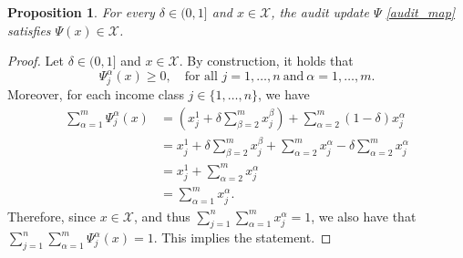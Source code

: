 \documentclass[10pt,a4paper]{amsart}
\newtheorem{proposition}{Proposition}
\begin{document}
\begin{proposition}\label{prop:audit}
For every $\delta \in (0,1]$ and $x \in \mathcal{X}$, the audit update $\Psi$ \eqref{audit_map} satisfies $\Psi(x)\in \mathcal{X}$. 
\end{proposition}

\begin{proof}
Let $\delta \in (0,1]$ and $x \in \mathcal{X}$. By construction, it holds that 
\begin{equation*}
    \Psi^\alpha_j(x) \geq 0, \quad \text{for all } j=1,\ldots,n \ \text{and} \ \alpha=1,\ldots,m.
\end{equation*}
Moreover, for each income class $j \in \{1,\ldots,n\}$, we have
\begin{align*}
 \sum_{\alpha=1}^m \Psi_j^\alpha(x)
&= \left(x_j^1 + \delta\sum_{\beta=2}^m x_j^\beta\right) + \sum_{\alpha=2}^m (1-\delta)x_j^\alpha \\
&= x_j^1 + \delta\sum_{\beta=2}^m x_j^\beta + \sum_{\alpha=2}^m x_j^\alpha - \delta\sum_{\alpha=2}^m x_j^\alpha \\
&= x_j^1 + \sum_{\alpha=2}^m x_j^\alpha \\
&= \sum_{\alpha=1}^m x_j^\alpha.
\end{align*}
Therefore, since $x\in \mathcal{X}$, and thus $\sum_{j=1}^n\sum_{\alpha=1}^m x_j^\alpha=1$, we also have that $\sum_{j=1}^n\sum_{\alpha=1}^m \Psi_j^\alpha(x)=1$. This implies the statement.
\end{proof}
\end{document}
